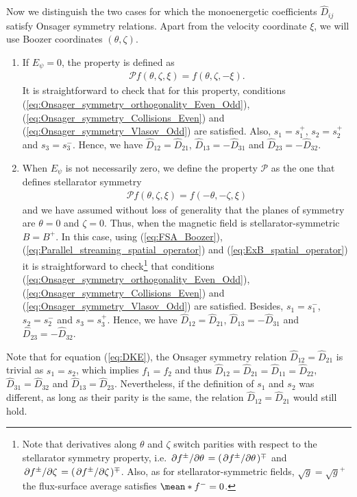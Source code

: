\documentclass[10pt]{iopart}
\begin{document}
Now we distinguish the two cases for which the monoenergetic coefficients $\widehat{D}_{ij} $ satisfy Onsager symmetry relations. Apart from the velocity coordinate $\xi$, we will use Boozer coordinates $( {\theta},\zeta)$.
\begin{enumerate}
	\item If $E_\psi=0$, the property is defined as 
	\begin{align}
		\mathcal{P} f( {\theta},\zeta,\xi) = f( {\theta},\zeta,-\xi).
	\end{align}
	It is straightforward to check that for this property, conditions (\ref{eq:Onsager_symmetry_orthogonality_Even_Odd}), (\ref{eq:Onsager_symmetry_Collisions_Even}) and (\ref{eq:Onsager_symmetry_Vlasov_Odd}) are satisfied. Also, $s_1= s_1^+$, $s_2 = s_2^+$ and $s_3 = s_3^-$. Hence, we have $\widehat{D}_{12}=\widehat{D}_{21}$, $\widehat{D}_{13}=-\widehat{D}_{31}$ and $\widehat{D}_{23}=-\widehat{D}_{32}$. 
	
	
	\item When $E_\psi$ is not necessarily zero, we define the property $\mathcal{P}$ as the one that defines stellarator symmetry \cite{DEWAR1998275}
	\begin{align}
		\mathcal{P} f( {\theta},\zeta,\xi) = f( - {\theta}, - \zeta,\xi)
	\end{align}
	and we have assumed without loss of generality that the planes of symmetry are $\theta=0$ and $ \zeta =0$. Thus, when the magnetic field is stellarator-symmetric $B=B^+$. In this case, using (\ref{eq:FSA_Boozer}), (\ref{eq:Parallel_streaming_spatial_operator}) and (\ref{eq:ExB_spatial_operator}) it is straightforward to check\footnote{Note that derivatives along $\theta$ and $\zeta$ switch parities with respect to the stellarator symmetry property, i.e. $\pdv*{f^\pm}{\theta} = (\pdv*{f^\pm}{\theta} )^\mp$ and $\pdv*{f^\pm}{\zeta} = (\pdv*{f^\pm}{\zeta} )^\mp$. Also, as for stellarator-symmetric fields, $\sqrt{g}=\sqrt{g}^+$ the flux-surface average satisfies $\mean*{f^-}=0$.} that conditions (\ref{eq:Onsager_symmetry_orthogonality_Even_Odd}), (\ref{eq:Onsager_symmetry_Collisions_Even}) and (\ref{eq:Onsager_symmetry_Vlasov_Odd}) are satisfied. Besides, $s_1=s_1^-$, $s_2 = s_2^-$ and $s_3 = s_3^+$. Hence, we have $\widehat{D}_{12}=\widehat{D}_{21}$, $\widehat{D}_{13}=-\widehat{D}_{31}$ and $\widehat{D}_{23}=-\widehat{D}_{32}$. 
\end{enumerate}

Note that for equation (\ref{eq:DKE}), the Onsager symmetry relation $\widehat{D}_{12}=\widehat{D}_{21}$ is trivial as $s_1=s_2$, which implies $f_1=f_2$ and thus $\widehat{D}_{12}=\widehat{D}_{21} = \widehat{D}_{11}= \widehat{D}_{22} $, $\widehat{D}_{31} = \widehat{D}_{32}$ and $\widehat{D}_{13} = \widehat{D}_{23}$. Nevertheless, if the definition of $s_1$ and $s_2$ was different, as long as their parity is the same, the relation $\widehat{D}_{12}=\widehat{D}_{21}$ would still hold.
\end{document}
